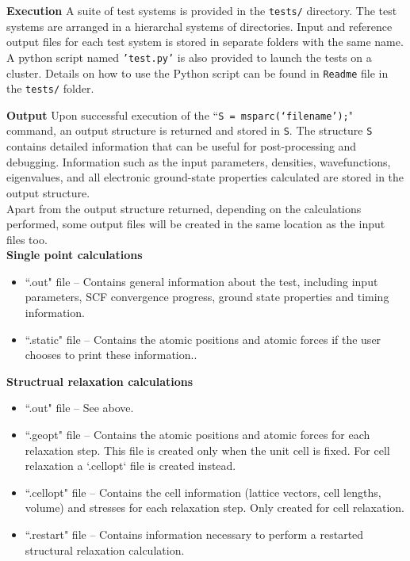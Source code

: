 \documentclass[xcolor=dvipsnames,t]{beamer}
\begin{document}
\begin{frame}{\textbf{Execution}}
A suite of test systems is provided in the \texttt{tests/} directory. The test systems are arranged in a hierarchal systems of directories. Input and reference output files for each test system is stored in separate folders with the same name. A python script named \texttt{'test.py'} is also provided to launch the tests on a cluster. Details on how to use the Python script can be found in \texttt{Readme} file in the \texttt{tests/} folder.
\end{frame}


\begin{frame}{\textbf{Output}} \label{Output}
Upon successful execution of the  
``\texttt{S = msparc(`filename');}"
command, an output structure is returned and stored in \texttt{S}. The structure \texttt{S} contains detailed information that can be useful for post-processing and debugging. Information such as the input parameters, densities, wavefunctions, eigenvalues, and all electronic ground-state properties calculated are stored in the output structure.\\

Apart from the output structure returned, depending on the calculations performed, some output files will be created in the same location as the input files too. \\

\textbf{Single point calculations}  \\
\begin{itemize}
  \item ``.out" file -- Contains general information about the test, including input parameters, SCF convergence progress, ground state properties and timing information.
  \item ``.static" file -- Contains the atomic positions and atomic forces if the user chooses to print these information..
\end{itemize}

\textbf{Structrual relaxation calculations}  \\
\begin{itemize}
  \item ``.out" file -- See above.
  \item ``.geopt" file -- Contains the atomic positions and atomic forces for each relaxation step. This file is created only when the unit cell is fixed. For cell relaxation a `.cellopt` file is created instead.
  \item ``.cellopt" file -- Contains the cell information (lattice vectors, cell lengths, volume) and stresses for each relaxation step. Only created for cell relaxation.
  \item ``.restart" file -- Contains information necessary to perform a restarted structural relaxation calculation. 
\end{itemize}


\end{frame}
\end{document}
